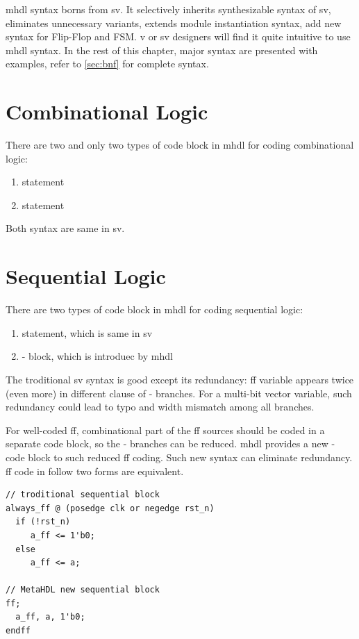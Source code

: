 \gls{mhdl} syntax borns from \gls{sv}. It selectively
 inherits synthesizable syntax of \gls{sv}, eliminates unnecessary
variants, extends module instantiation syntax, add new syntax for
Flip-Flop and FSM. \gls{v} or \gls{sv} designers will find it quite
intuitive to use \gls{mhdl} syntax. In the rest of this chapter,
major syntax are presented with examples, refer to \autoref{sec:bnf} for complete syntax.

\section{Combinational Logic}
There are two and only two types of \gls{code block} in 
\gls*{mhdl} for coding combinational logic:
\begin{enumerate}
\item {} statement
\item {} statement
\end{enumerate}
Both syntax are same in \gls*{sv}. 

\section{Sequential Logic}
There are two types of \gls{code block} in \gls*{mhdl} for coding
sequential logic:
\begin{enumerate}
\item {} statement, which is same in \gls*{sv}
\item {} -  block, which is introduec by \gls*{mhdl}
\end{enumerate}
The troditional \gls*{sv} syntax is good except its redundancy: \gls{ff}
variable appears twice (even more) in different clause of -
branches. For a multi-bit vector variable, such redundancy could lead 
to typo and width mismatch among all branches. 

For well-coded \gls{ff}, combinational part of the \gls{ff} sources should be
coded in a separate \gls{code block}, so the - branches 
can be reduced. \gls{mhdl} provides a new - \gls{code block}
to such reduced \gls*{ff} coding. Such new syntax can eliminate redundancy. 
\gls{ff} code in follow two forms are equivalent. 
\begin{lstlisting}
// troditional sequential block
always_ff @ (posedge clk or negedge rst_n)
  if (!rst_n)
     a_ff <= 1'b0;
  else 
     a_ff <= a;

// MetaHDL new sequential block
ff; 
  a_ff, a, 1'b0;
endff
\end{lstlisting}

